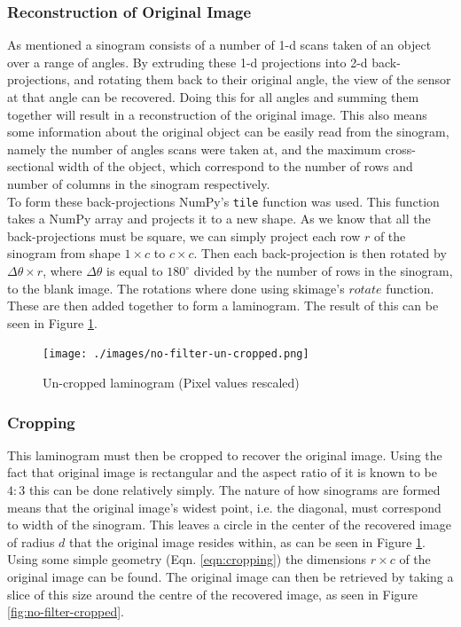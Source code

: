 \documentclass[12pt, a4paper]{article}
\begin{document}
	\subsubsection*{Reconstruction of Original Image}
	As mentioned a sinogram consists of a number of 1-d scans taken of an object over a range of angles. By extruding these 1-d projections into 2-d back-projections, and rotating them back to their original angle, the view of the sensor at that angle can be recovered. Doing this for all angles and summing them together will result in a reconstruction of the original image. This also means some information about the original object can be easily read from the sinogram, namely the number of angles scans were taken at, and the maximum cross-sectional width of the object, which correspond to the number of rows and number of columns in the sinogram respectively. \\
	To form these back-projections NumPy's \texttt{tile} function was used. This function takes a NumPy array and projects it to a new shape. As we know that all the back-projections must be square, we can simply project each row $r$ of the sinogram from shape $1 \times c$ to $c \times c$. Then each back-projection is then rotated by $\Delta\theta \times r$, where $\Delta\theta$ is equal to $180^\circ$ divided by the number of rows in the sinogram, to the blank image. The rotations where done using skimage's $rotate$ function. These are then added together to form a laminogram. The result of this can be seen in Figure \ref{fig:no-filter-un-cropped}. \\
	
	\begin{figure}
		\centering
		\texttt{[image: ./images/no-filter-un-cropped.png]}
		\caption{Un-cropped laminogram (Pixel values rescaled)}
		\label{fig:no-filter-un-cropped}
	\end{figure}
	
	\subsubsection*{Cropping}
	This laminogram must then be cropped to recover the original image. Using the fact that original image is rectangular and the aspect ratio of it is known to be $4:3$ this can be done relatively simply. The nature of how sinograms are formed means that the original image's widest point, i.e. the diagonal, must correspond to width of the sinogram. This leaves a circle in the center of the recovered image of radius $d$ that the original image resides within, as can be seen in Figure \ref{fig:no-filter-un-cropped}. Using some simple geometry (Eqn. \ref{eqn:cropping}) the dimensions $r \times c$ of the original image can be found. The original image can then be retrieved by taking a slice of this size around the centre of the recovered image, as seen in Figure \ref{fig:no-filter-cropped}.
	
\end{document}
